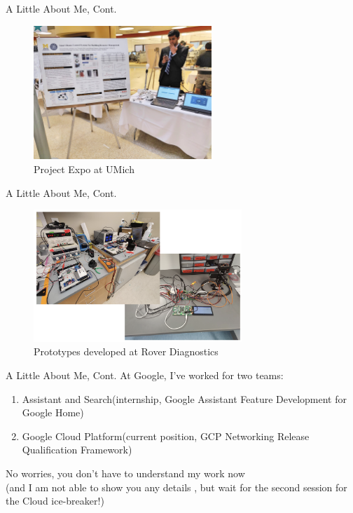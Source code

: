 \documentclass[aspectratio=169, 12pt]{beamer}
\begin{document}
\begin{frame}{A Little About Me, Cont.}
    \begin{figure}
        \centering
        \includegraphics[width=0.6\textwidth]{assets/GMDP.jpg}
        \caption{Project Expo at UMich}
        \label{fig:GMDP}
    \end{figure}
\end{frame}

\begin{frame}{A Little About Me, Cont.}
    \begin{figure}
        \centering
        \includegraphics[width=0.7\textwidth]{assets/Rover_3.png}
        \caption{Prototypes developed at Rover Diagnostics}
        \label{fig:Rover}
    \end{figure}
\end{frame}

\begin{frame}{A Little About Me, Cont.}
    At Google, I've worked for two teams:
    \begin{enumerate}
    \item Assistant and Search(internship, Google Assistant Feature Development for Google Home)
    \item Google Cloud Platform(current position, GCP Networking Release Qualification Framework)
    \end{enumerate}
    \medskip
    No worries, you don't have to understand my work now \smiley{} 
    \\\medskip(and I am not able to show you any details \frownie{}, but wait for the second session for the Cloud ice-breaker!)
\end{frame}
\end{document}
